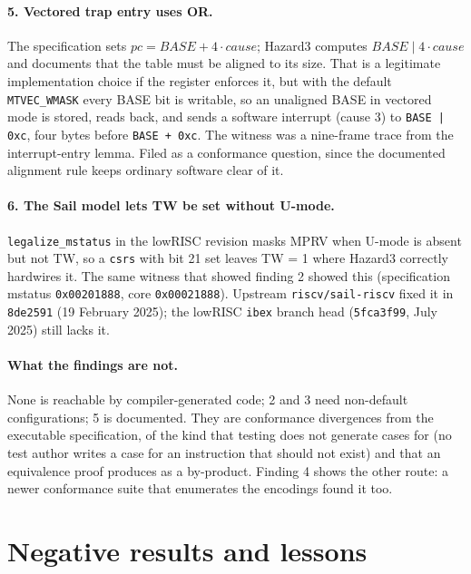 \documentclass[11pt]{article}
\newcommand{\code}[1]{\texttt{#1}}
\begin{document}
\paragraph{5. Vectored trap entry uses OR.}
The specification sets $pc = \mathit{BASE} + 4 \cdot \mathit{cause}$; Hazard3
computes $\mathit{BASE} \mid 4 \cdot \mathit{cause}$ and documents that the
table must be aligned to its size. That is a legitimate implementation choice
if the register enforces it, but with the default \code{MTVEC\_WMASK} every
BASE bit is writable, so an unaligned BASE in vectored mode is stored, reads
back, and sends a software interrupt (cause 3) to \code{BASE | 0xc}, four
bytes before \code{BASE + 0xc}. The witness was a nine-frame trace from the
interrupt-entry lemma. Filed as a conformance question, since the documented
alignment rule keeps ordinary software clear of it.

\paragraph{6. The Sail model lets TW be set without U-mode.}
\code{legalize\_mstatus} in the lowRISC revision masks MPRV when U-mode is
absent but not TW, so a \code{csrs} with bit 21 set leaves TW = 1 where Hazard3
correctly hardwires it. The same witness that showed finding 2 showed this
(specification mstatus \code{0x00201888}, core \code{0x00021888}). Upstream
\code{riscv/sail-riscv} fixed it in \code{8de2591} (19 February 2025); the
lowRISC \code{ibex} branch head (\code{5fca3f99}, July 2025) still lacks it.

\paragraph{What the findings are not.}
None is reachable by compiler-generated code; 2 and 3 need non-default
configurations; 5 is documented. They are conformance divergences from the
executable specification, of the kind that testing does not generate cases for
(no test author writes a case for an instruction that should not exist) and
that an equivalence proof produces as a by-product. Finding 4 shows the other
route: a newer conformance suite that enumerates the encodings found it too.

\section{Negative results and lessons}
\end{document}
